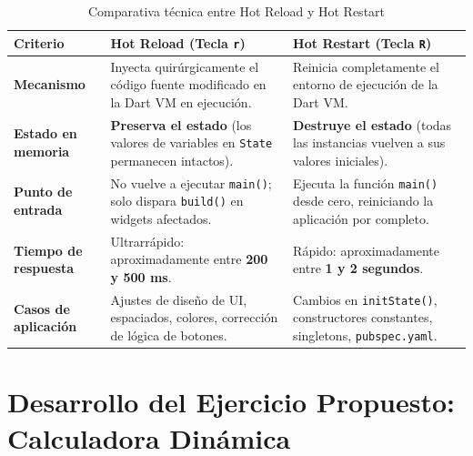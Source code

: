 \documentclass[12pt,a4paper]{article}
\begin{document}
\begin{table}[h!]
\small
\noindent
\begin{tabularx}{\textwidth}{@{}p{3.0cm}XX@{}}
\toprule
\textbf{Criterio} & \textbf{Hot Reload (Tecla \texttt{r})} & \textbf{Hot Restart (Tecla \texttt{R})} \\ \midrule
\textbf{Mecanismo} & Inyecta quirúrgicamente el código fuente modificado en la Dart VM en ejecución. & Reinicia completamente el entorno de ejecución de la Dart VM. \\
\textbf{Estado en memoria} & \textbf{Preserva el estado} (los valores de variables en \texttt{State} permanecen intactos). & \textbf{Destruye el estado} (todas las instancias vuelven a sus valores iniciales). \\
\textbf{Punto de entrada} & No vuelve a ejecutar \texttt{main()}; solo dispara \texttt{build()} en widgets afectados. & Ejecuta la función \texttt{main()} desde cero, reiniciando la aplicación por completo. \\
\textbf{Tiempo de respuesta} & Ultrarrápido: aproximadamente entre \textbf{200 y 500 ms}. & Rápido: aproximadamente entre \textbf{1 y 2 segundos}. \\
\textbf{Casos de aplicación} & Ajustes de diseño de UI, espaciados, colores, corrección de lógica de botones. & Cambios en \texttt{initState()}, constructores constantes, singletons, \texttt{pubspec.yaml}. \\ \bottomrule
\end{tabularx}
\caption{Comparativa técnica entre Hot Reload y Hot Restart}
\end{table}

\section{Desarrollo del Ejercicio Propuesto: Calculadora Dinámica}
\end{document}
